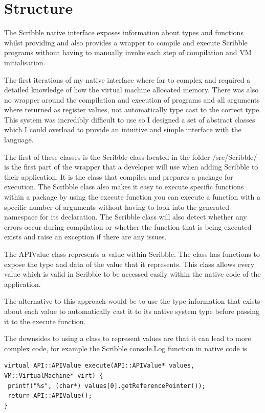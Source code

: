 \documentclass[]{final_report}
\begin{document}
\section{Structure}

The Scribble native interface exposes information about types and functions whilst providing and also provides a wrapper to compile and execute Scribble programs without having to manually invoke each step of compilation and VM initialisation.

The first iterations of my native interface where far to complex and required a detailed knowledge of how the virtual machine allocated memory. There was also no wrapper around the compilation and execution of programs and all arguments where returned as register values, not automatically type cast to the correct type. This system was incredibly difficult to use so I designed a set of abstract classes which I could overload to provide an intuitive and simple interface with the language.

The first of these classes is the Scribble class located in the folder /src/Scribble/ is the first part of the wrapper that a developer will use when adding Scribble to their application. It is the class that compiles and prepares a package for execution. The Scribble class also makes it easy to execute specific functions within a package by using the execute function you can execute a function with a specific number of arguments without having to look into the generated namespace for its declaration. The Scribble class will also detect whether any errors occur during compilation or whether the function that is being executed exists and raise an exception if there are any issues.

The APIValue class represents a value within Scribble. The class has functions to expose the type and data of the value that it represents. This class allows every value which is valid in Scribble to be accessed easily within the native code of the application.

The alternative to this approach would be to use the type information that exists about each value to automatically cast it to its native system type before passing it to the execute function.

The downsides to using a class to represent values are that it can lead to more complex code, for example the Scribble console.Log function in native code is 

\begin{verbatim}
virtual API::APIValue execute(API::APIValue* values, VM::VirtualMachine* virt) {
 printf("%s", (char*) values[0].getReferencePointer());
 return API::APIValue();
}
\end{verbatim}
\end{document}
